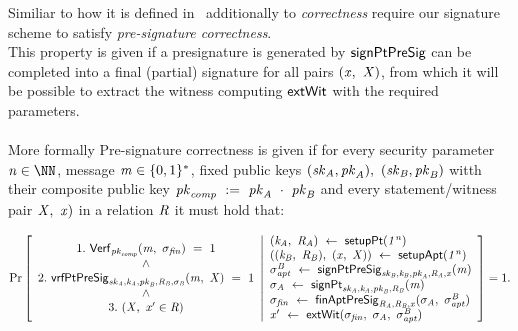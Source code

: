 \begin{definition}\label{def:preSigCorrectness}
    Similiar to how it is defined in~\cite{aumayr2020bitcoinchannels} additionally to \textit{correctness} require our signature scheme to satisfy \textit{pre-signature correctness}. \\
    This property is given if a presignature is generated by $\mathsf{signPtPreSig}$ can be completed into a final (partial) signature for all pairs $(\mathit{x} ,~ \mathit{X})$, from which it will
    be possible to extract the witness computing $\mathsf{extWit}$ with the required parameters.\\ \\
    More formally Pre-signature correctness is given if for every security parameter $\varN \in \cnstNatural$, message $\mathit{m} \in \{0,1\}^{*}$, fixed public keys $(\mathit{sk}_{\mathit{A}}, \mathit{pk}_{\mathit{A}}) ,~ (\mathit{sk}_{\mathit{B}}, \mathit{pk}_{\mathit{B}})$ witth their composite public key $\mathit{pk}_{\mathit{comp}} ~:=~ \mathit{pk}_{\mathit{A}} ~\cdot~ \mathit{pk}_{\mathit{B}}$ and every statement/witness pair $\mathit{X} ,~ \mathit{x})$ in a relation $\mathit{R}$ it must hold that:
\begin{scriptsize}
    \[
        \Pr\left[
        \begin{array}{c}
            1.~\mathsf{Verf}_{\mathit{pk}_{\mathit{comp}}}(\mathit{m} ,~ \sigma_{\mathit{fin}}) ~=~ 1 \\
            ~\land~ \\
            2.~\mathsf{vrfPtPreSig}_{\mathit{sk}_{\mathit{A}},\mathit{\mathit{k}_{\mathit{A}}},\mathit{pk}_{\mathit{B}},\mathit{R}_{\mathit{B}},\sigma_{\mathit{B}}}(\mathit{m} ,~ \mathit{X}) ~=~ 1 \\
            ~\land~ \\
            3.~(\mathit{X} ,~ \mathit{x}' \in \mathit{R})
        \end{array}
        \middle\vert
        \begin{array}{l}
            (\mathit{\mathit{k}_{\mathit{A}}} ,~ \mathit{R}_{\mathit{A}}) ~\leftarrow~ \mathsf{setupPt} (\mathit{1^n}) \\
            ((\mathit{\mathit{k}_{\mathit{B}}} ,~ \mathit{R}_{\mathit{B}}) ,~ (\mathit{x} ,~ \mathit{X})) ~\leftarrow~ \mathsf{setupApt}(\mathit{1^n}) \\
            \sigma^{\mathit{B}}_{\mathit{apt}} ~\leftarrow~ \mathsf{signPtPreSig}_{\mathit{sk}_{\mathit{B}},\mathit{\mathit{k}_{\mathit{B}}},\mathit{pk}_{\mathit{A}},\mathit{R}_{\mathit{A}},\mathit{x}}(\mathit{m}) \\
            \sigma_{\mathit{A}} ~\leftarrow~ \mathsf{signPt}_{\mathit{sk}_{\mathit{A}},\mathit{\mathit{k}_{\mathit{A}}},\mathit{pk}_{\mathit{B}},\mathit{R}_{\mathit{B}}}(\mathit{m}) \\
            \sigma_{\mathit{fin}} ~\leftarrow~ \mathsf{finAptPreSig}_{\mathit{R}_{\mathit{A}},\mathit{R}_{\mathit{B}},\mathit{x}}(\sigma_{\mathit{A}} ,~ \sigma^{\mathit{B}}_{\mathit{apt}}) \\
            \mathit{x}' ~\leftarrow~ \mathsf{extWit}(\sigma_{\mathit{fin}} ,~ \sigma_{\mathit{A}} ,~ \sigma^{\mathit{B}}_{\mathit{apt}})
        \end{array}
        \right]=1.
    \]
\end{scriptsize}
\end{definition}

